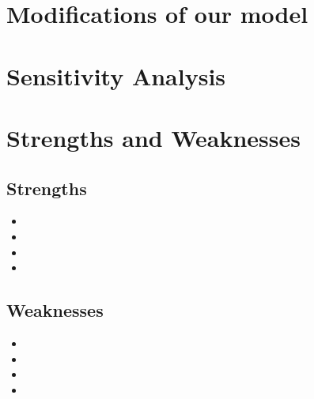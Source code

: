 \documentclass{mcmthesis}
\begin{document}
\section{Modifications of our model}%


\section{Sensitivity Analysis}


\section{Strengths and Weaknesses}



\subsection{Strengths}
\begin{itemize}
	\item 
	
	\item
	
	\item
	
	\item
	
\end{itemize}

\subsection{Weaknesses}
\begin{itemize}
	\item 
	
	\item
	
	\item
	
	\item
	
\end{itemize}



\end{document}
